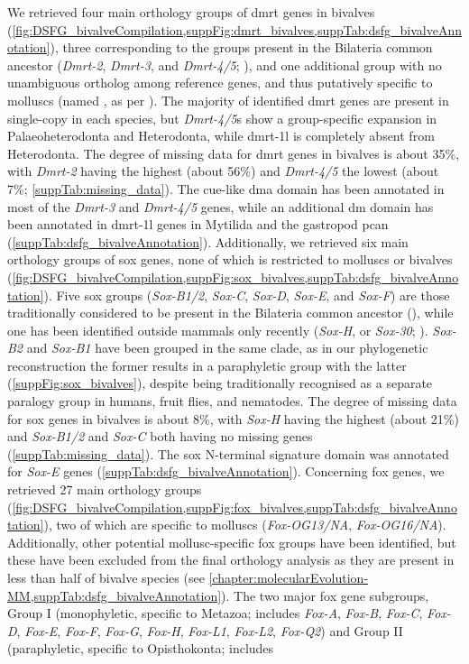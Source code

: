 We retrieved four main orthology groups of \gls{dmrt} genes in bivalves (\cref{fig:DSFG_bivalveCompilation,suppFig:dmrt_bivalves,suppTab:dsfg_bivalveAnnotation}), three corresponding to the groups present in the Bilateria common ancestor (\textit{Dmrt-2}, \textit{Dmrt-3}, and \textit{Dmrt-4/5}; ), and one additional group with no unambiguous ortholog among reference genes, and thus putatively specific to molluscs (named , as per ). The majority of identified \gls{dmrt} genes are present in single-copy in each species, but \textit{Dmrt-4/5}s show a group-specific expansion in Palaeoheterodonta and Heterodonta, while \gls{dmrt-1l} is completely absent from Heterodonta. The degree of missing data for \gls{dmrt} genes in bivalves is about 35\%, with \textit{Dmrt-2} having the highest (about 56\%) and \textit{Dmrt-4/5} the lowest (about 7\%; \cref{suppTab:missing_data}). The \gls{cue}-like \gls{dma} domain has been annotated in most of the \textit{Dmrt-3} and \textit{Dmrt-4/5} genes, while an additional \gls{dm} domain has been annotated in \gls{dmrt-1l} genes in Mytilida and the gastropod \gls{pcan} (\cref{suppTab:dsfg_bivalveAnnotation}). Additionally, we retrieved six main orthology groups of \gls{sox} genes, none of which is restricted to molluscs or bivalves (\cref{fig:DSFG_bivalveCompilation,suppFig:sox_bivalves,suppTab:dsfg_bivalveAnnotation}). Five \gls{sox} groups (\textit{Sox-B1/2}, \textit{Sox-C}, \textit{Sox-D}, \textit{Sox-E}, and \textit{Sox-F}) are those traditionally considered to be present in the Bilateria common ancestor (), while one has been identified outside mammals only recently (\textit{Sox-H}, or \textit{Sox-30}; ). \textit{Sox-B2} and \textit{Sox-B1} have been grouped in the same clade, as in our phylogenetic reconstruction the former results in a paraphyletic group with the latter (\cref{suppFig:sox_bivalves}), despite being traditionally recognised as a separate paralogy group in humans, fruit flies, and nematodes. The degree of missing data for \gls{sox} genes in bivalves is about 8\%, with \textit{Sox-H} having the highest (about 21\%) and \textit{Sox-B1/2} and \textit{Sox-C} both having no missing genes (\cref{suppTab:missing_data}). The \gls{sox} N-terminal signature domain was annotated for \textit{Sox-E} genes (\cref{suppTab:dsfg_bivalveAnnotation}). Concerning \gls{fox} genes, we retrieved 27 main orthology groups (\cref{fig:DSFG_bivalveCompilation,suppFig:fox_bivalves,suppTab:dsfg_bivalveAnnotation}), two of which are specific to molluscs (\textit{Fox-OG13/NA}, \textit{Fox-OG16/NA}). Additionally, other potential mollusc-specific \gls{fox} groups have been identified, but these have been excluded from the final orthology analysis as they are present in less than half of bivalve species (see \cref{chapter:molecularEvolution-MM,suppTab:dsfg_bivalveAnnotation}). The two major \gls{fox} gene subgroups, Group I (monophyletic, specific to Metazoa; includes \textit{Fox-A}, \textit{Fox-B}, \textit{Fox-C}, \textit{Fox-D}, \textit{Fox-E}, \textit{Fox-F}, \textit{Fox-G}, \textit{Fox-H}, \textit{Fox-L1}, \textit{Fox-L2}, \textit{Fox-Q2}) and Group II (paraphyletic, specific to Opisthokonta; includes 